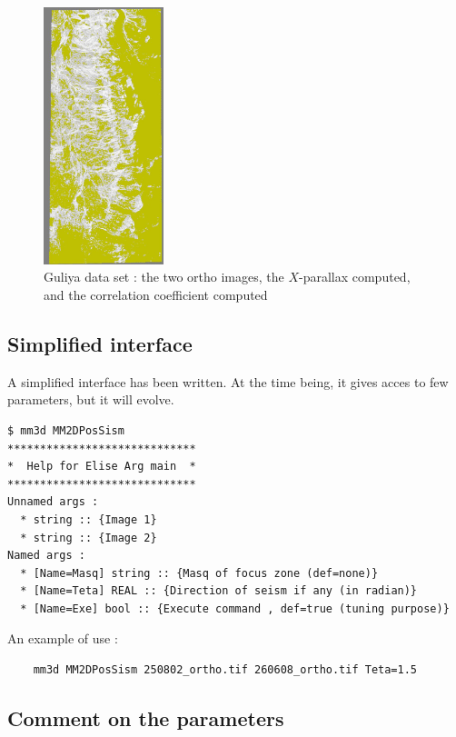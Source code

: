 \begin{figure}
\begin{center}
\includegraphics[width=35mm]{FIGS/SeismGuylia/Correl.jpg} %

\end{center}
\caption{Guliya data set : the two ortho images, the $X$-parallax computed, and the correlation
coefficient computed}
\label{FIG:OK:Guylia}
\end{figure}


\subsection{Simplified interface}

A simplified interface has been written. At the time being, it gives acces to few parameters, but
it will evolve.

\begin{verbatim}
$ mm3d MM2DPosSism
*****************************
*  Help for Elise Arg main  *
*****************************
Unnamed args :
  * string :: {Image 1}
  * string :: {Image 2}
Named args :
  * [Name=Masq] string :: {Masq of focus zone (def=none)}
  * [Name=Teta] REAL :: {Direction of seism if any (in radian)}
  * [Name=Exe] bool :: {Execute command , def=true (tuning purpose)}
\end{verbatim}

An example of use :

\begin{verbatim}
    mm3d MM2DPosSism 250802_ortho.tif 260608_ortho.tif Teta=1.5
\end{verbatim}


\subsection{Comment on the parameters}


